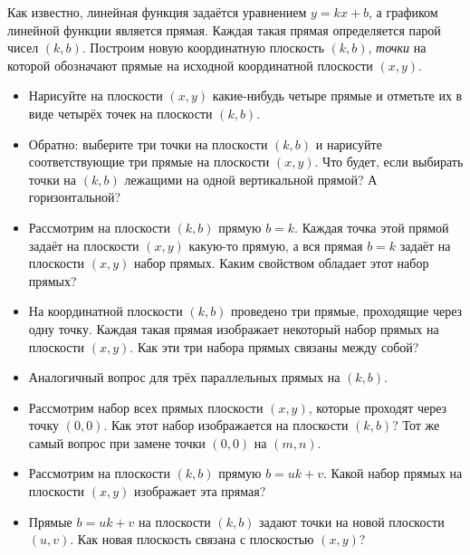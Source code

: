 
Как известно, линейная функция задаётся уравнением $y = kx + b$, а графиком линейной функции является прямая. Каждая такая прямая определяется парой чисел $(k,b)$. Построим новую координатную плоскость $(k,b)$, {\itshape точки} на которой обозначают прямые на исходной координатной плоскости $(x,y)$. 

\begin{itemize}
\item Нарисуйте на плоскости $(x,y)$ какие-нибудь четыре прямые и отметьте их в виде четырёх точек на плоскости $(k,b)$. 
\item Обратно: выберите три точки на плоскости $(k,b)$ и нарисуйте соответствующие три прямые на плоскости $(x,y)$. Что будет, если выбирать точки на $(k,b)$ лежащими на одной вертикальной прямой? А горизонтальной?
\item Рассмотрим на плоскости $(k,b)$ прямую $b=k$. Каждая точка этой прямой задаёт на плоскости $(x,y)$ какую-то прямую, а вся прямая $b=k$ задаёт на плоскости $(x,y)$ набор прямых. Каким свойством обладает этот набор прямых?
\item На координатной плоскости $(k,b)$ проведено три прямые, проходящие через одну точку. Каждая такая прямая изображает некоторый набор прямых на плоскости $(x,y)$. Как эти три набора прямых связаны между собой?
\item Аналогичный вопрос для трёх параллельных прямых на $(k,b)$.
\item Рассмотрим набор всех прямых плоскости $(x,y)$, которые проходят через точку $(0,0)$. Как этот набор изображается на плоскости $(k,b)$? Тот же самый вопрос при замене точки $(0,0)$ на $(m,n)$.
\item Рассмотрим на плоскости $(k,b)$ прямую $b = uk + v$. Какой набор прямых на плоскости $(x,y)$ изображает эта прямая? 
\item Прямые $b = uk + v$ на плоскости $(k,b)$ задают точки на новой плоскости $(u,v)$. Как новая плоскость связана с плоскостью $(x,y)$?
\end{itemize}